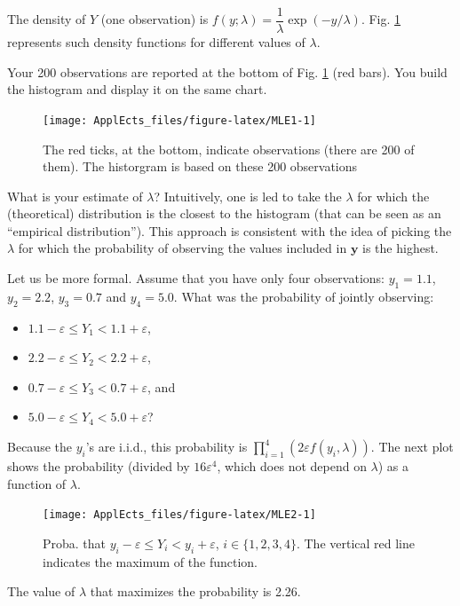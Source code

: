 \documentclass[
  12pt,
]{book}
\providecommand{\tightlist}{%
  \setlength{\itemsep}{0pt}\setlength{\parskip}{0pt}}
\theoremstyle{definition}
\theoremstyle{definition}
\theoremstyle{definition}
\theoremstyle{definition}
\theoremstyle{remark}
\begin{document}
The density of \(Y\) (one observation) is \(f(y;\lambda) = \dfrac{1}{\lambda}\exp(-y/\lambda)\). Fig. \ref{fig:MLE1} represents such density functions for different values of \(\lambda\).

Your 200 observations are reported at the bottom of Fig. \ref{fig:MLE1} (red bars). You build the histogram and display it on the same chart.

\begin{figure}
\texttt{[image: ApplEcts\_files/figure-latex/MLE1-1]} \caption{The red ticks, at the bottom, indicate observations (there are 200 of them). The historgram is based on these 200 observations}\label{fig:MLE1}
\end{figure}

What is your estimate of \(\lambda\)? Intuitively, one is led to take the \(\lambda\) for which the (theoretical) distribution is the closest to the histogram (that can be seen as an ``empirical distribution''). This approach is consistent with the idea of picking the \(\lambda\) for which the probability of observing the values included in \(\mathbf{y}\) is the highest.

Let us be more formal. Assume that you have only four observations: \(y_1=1.1\), \(y_2=2.2\), \(y_3=0.7\) and \(y_4=5.0\). What was the probability of jointly observing:

\begin{itemize}
\tightlist
\item
  \(1.1-\varepsilon \le Y_1 < 1.1+\varepsilon\),
\item
  \(2.2-\varepsilon \le Y_2 < 2.2+\varepsilon\),
\item
  \(0.7-\varepsilon \le Y_3 < 0.7+\varepsilon\), and
\item
  \(5.0-\varepsilon \le Y_4 < 5.0+\varepsilon\)?
\end{itemize}

Because the \(y_i\)'s are i.i.d., this probability is \(\prod_{i=1}^4(2\varepsilon f(y_i,\lambda))\).
The next plot shows the probability (divided by \(16\varepsilon^4\), which does not depend on \(\lambda\)) as a function of \(\lambda\).

\begin{figure}
\texttt{[image: ApplEcts\_files/figure-latex/MLE2-1]} \caption{Proba. that $y_i-\varepsilon \le Y_i < y_i+\varepsilon$, $i \in \{1,2,3,4\}$. The vertical red line indicates the maximum of the function.}\label{fig:MLE2}
\end{figure}

The value of \(\lambda\) that maximizes the probability is 2.26.
\end{document}
